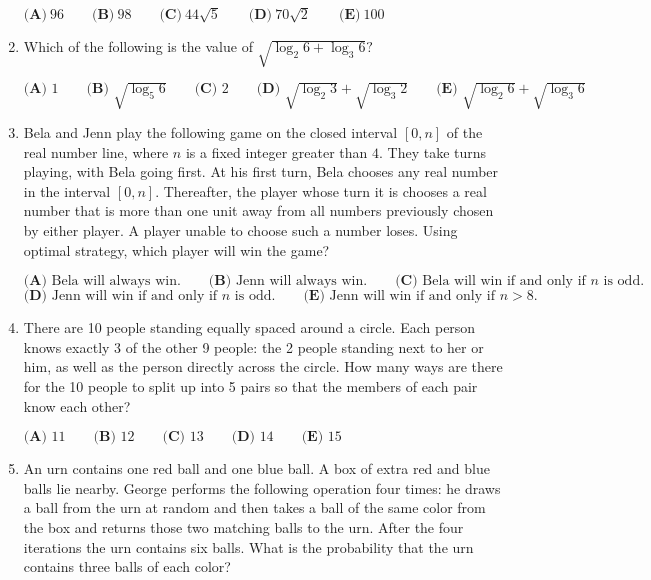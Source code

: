 \documentclass{article}
\begin{document}
\begin{enumerate}[label=\arabic*., itemsep=0.5em]
\(\textbf{(A)}\ 96 \qquad\textbf{(B)}\ 98 \qquad\textbf{(C)}\  44\sqrt5 \qquad\textbf{(D)}\ 70\sqrt2 \qquad\textbf{(E)}\ 100\)\par \vspace{0.5em}\item Which of the following is the value of \(\sqrt{\log_2{6}+\log_3{6}}?\)

\(\textbf{(A) } 1 \qquad\textbf{(B) } \sqrt{\log_5{6}} \qquad\textbf{(C) } 2 \qquad\textbf{(D) } \sqrt{\log_2{3}}+\sqrt{\log_3{2}} \qquad\textbf{(E) } \sqrt{\log_2{6}}+\sqrt{\log_3{6}}\)\par \vspace{0.5em}\item Bela and Jenn play the following game on the closed interval \([0, n]\) of the real number line, where \(n\) is a fixed integer greater than \(4\). They take turns playing, with Bela going first. At his first turn, Bela chooses any real number in the interval \([0, n]\). Thereafter, the player whose turn it is chooses a real number that is more than one unit away from all numbers previously chosen by either player. A player unable to choose such a number loses. Using optimal strategy, which player will win the game?

\(\textbf{(A)} \text{ Bela will always win.} \qquad \textbf{(B)} \text{ Jenn will always win.} \qquad \textbf{(C)} \text{ Bela will win if and only if }n \text{ is odd.}\)
\(\textbf{(D)} \text{ Jenn will win if and only if }n \text{ is odd.} \qquad \textbf{(E)} \text { Jenn will win if and only if } n>8.\)\par \vspace{0.5em}\item There are 10 people standing equally spaced around a circle. Each person knows exactly 3 of the other 9 people: the 2 people standing next to her or him, as well as the person directly across the circle. How many ways are there for the 10 people to split up into 5 pairs so that the members of each pair know each other?

\(\textbf{(A) } 11 \qquad \textbf{(B) } 12 \qquad \textbf{(C) } 13 \qquad \textbf{(D) } 14 \qquad \textbf{(E) } 15\)\par \vspace{0.5em}\item An urn contains one red ball and one blue ball. A box of extra red and blue balls lie nearby. George performs the following operation four times: he draws a ball from the urn at random and then takes a ball of the same color from the box and returns those two matching balls to the urn. After the four iterations the urn contains six balls. What is the probability that the urn contains three balls of each color?


\end{enumerate}
\end{document}

